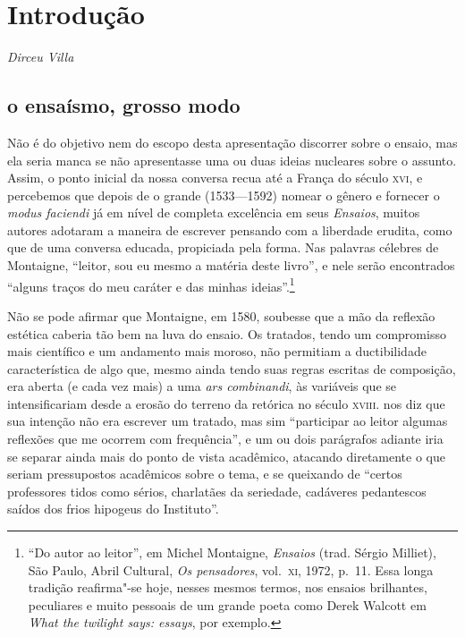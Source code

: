 {}
\chapter*{Introdução}

\begin{flushright}
\emph{Dirceu Villa}
\end{flushright}

\section{o ensaísmo, grosso modo}

Não é do objetivo nem do escopo desta apresentação discorrer sobre o
ensaio, mas ela seria manca se não apresentasse uma ou duas ideias
nucleares sobre o assunto. Assim, o ponto inicial da nossa conversa
recua até a França do século \textsc{xvi}, e percebemos que depois de o grande	
 (1533---1592) nomear o gênero e fornecer o
\textit{modus faciendi} já em nível de completa excelência em seus
\textit{Ensaios}, muitos autores adotaram a maneira de escrever
pensando com a liberdade erudita, como que de uma conversa educada,
propiciada pela forma. Nas palavras célebres de Montaigne, “leitor, sou
eu mesmo a matéria deste livro”, e nele serão encontrados “alguns
traços do meu caráter e das minhas ideias”.\footnote{ “Do autor ao
leitor”, em Michel Montaigne, \textit{Ensaios} (trad.
Sérgio Milliet), São Paulo, Abril Cultural, \textit{Os
pensadores}, vol.~\textsc{xi}, 1972, p.~11. Essa longa tradição 
reafirma"-se hoje,
nesses mesmos termos, nos ensaios brilhantes, peculiares e muito
pessoais de um grande poeta como Derek Walcott em \textit{What the 
twilight says: essays}, por exemplo.}

Não se pode afirmar que Montaigne, em 1580, soubesse que a mão da
reflexão estética caberia tão bem na luva do ensaio. Os tratados, tendo
um compromisso mais científico e um andamento mais moroso, não
permitiam a ductibilidade característica de algo que, mesmo ainda tendo
suas regras escritas de composição, era aberta (e cada vez mais) a uma
\textit{ars combinandi}, às variáveis que se intensificariam desde a
erosão do terreno da retórica no século \textsc{xviii}.  nos diz que
sua intenção não era escrever um tratado, mas sim “participar ao leitor
algumas reflexões que me ocorrem com frequência”, e um ou dois
parágrafos adiante iria se separar ainda mais do ponto de vista
acadêmico, atacando diretamente o que seriam pressupostos acadêmicos
sobre o tema, e se queixando de “certos professores tidos como sérios,
charlatães da seriedade, cadáveres pedantescos saídos dos frios
hipogeus do Instituto”.

